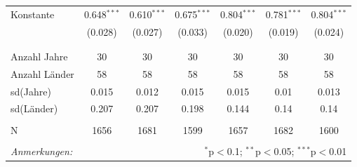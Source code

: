 \documentclass{standalone}
\begin{document}
\begin{table}[!htbp]
\begin{tabular}{@{\extracolsep{5pt}}lcccccc}
 Konstante & 0.648$^{***}$ & 0.610$^{***}$ & 0.675$^{***}$ & 0.804$^{***}$ & 0.781$^{***}$ & 0.804$^{***}$ \\ 
  & (0.028) & (0.027) & (0.033) & (0.020) & (0.019) & (0.024) \\ 
  & & & & & & \\ 
\hline \\[-1.8ex] 
Anzahl Jahre & 30 & 30 & 30 & 30 & 30 & 30 \\ 
Anzahl Länder & 58 & 58 & 58 & 58 & 58 & 58 \\ 
sd(Jahre) & 0.015 & 0.012 & 0.015 & 0.015 & 0.01 & 0.013 \\ 
sd(Länder) & 0.207 & 0.207 & 0.198 & 0.144 & 0.14 & 0.14 \\ 
 &  &  &  &  &  &  \\ 
N & 1656 & 1681 & 1599 & 1657 & 1682 & 1600 \\ 
\hline 
\hline \\[-1.8ex] 
\textit{Anmerkungen:}  & \multicolumn{6}{r}{$^{*}$p$<$0.1; $^{**}$p$<$0.05; $^{***}$p$<$0.01} \\ 
\end{tabular} 
\end{table} 
\end{document}
